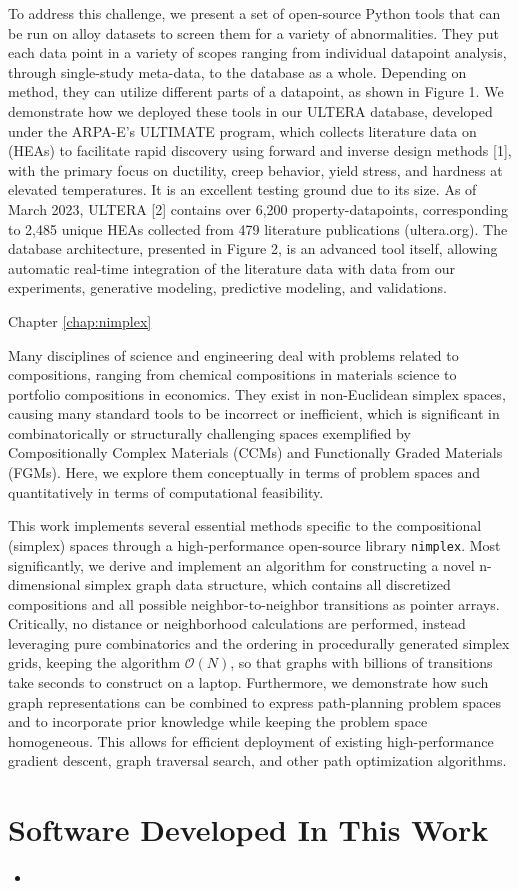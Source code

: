 To address this challenge, we present a set of open-source Python tools that can be run on alloy datasets to screen them for a variety of abnormalities. They put each data point in a variety of scopes ranging from individual datapoint analysis, through single-study meta-data, to the database as a whole. Depending on method, they can utilize different parts of a datapoint, as shown in Figure 1.
We demonstrate how we deployed these tools in our ULTERA database, developed under the ARPA-E's ULTIMATE program, which collects literature data on (HEAs) to facilitate rapid discovery using forward and inverse design methods [1], with the primary focus on ductility, creep behavior, yield stress, and hardness at elevated temperatures. It is an excellent testing ground due to its size. As of March 2023, ULTERA [2] contains over 6,200 property-datapoints, corresponding to 2,485 unique HEAs collected from 479 literature publications (ultera.org). The database architecture, presented in Figure 2, is an advanced tool itself, allowing automatic real-time integration of the literature data with data from our experiments, generative modeling, predictive modeling, and validations.





Chapter \ref{chap:nimplex}

Many disciplines of science and engineering deal with problems related to compositions, ranging from chemical compositions in materials science to portfolio compositions in economics. They exist in non-Euclidean simplex spaces, causing many standard tools to be incorrect or inefficient, which is significant in combinatorically or structurally challenging spaces exemplified by Compositionally Complex Materials (CCMs) and Functionally Graded Materials (FGMs). Here, we explore them conceptually in terms of problem spaces and quantitatively in terms of computational feasibility.

This work implements several essential methods specific to the compositional (simplex) spaces through a high-performance open-source library \texttt{nimplex}. Most significantly, we derive and implement an algorithm for constructing a novel n-dimensional simplex graph data structure, which contains all discretized compositions and all possible neighbor-to-neighbor transitions as pointer arrays. Critically, no distance or neighborhood calculations are performed, instead leveraging pure combinatorics and the ordering in procedurally generated simplex grids, keeping the algorithm $\mathcal{O}(N)$, so that graphs with billions of transitions take seconds to construct on a laptop. Furthermore, we demonstrate how such graph representations can be combined to express path-planning problem spaces and to incorporate prior knowledge while keeping the problem space homogeneous. This allows for efficient deployment of existing high-performance gradient descent, graph traversal search, and other path optimization algorithms.


\section{Software Developed In This Work} \label{intro:sec:software}


\begin{itemize}
    \item 
\end{itemize}



\printbibliography[heading=subbibintoc]